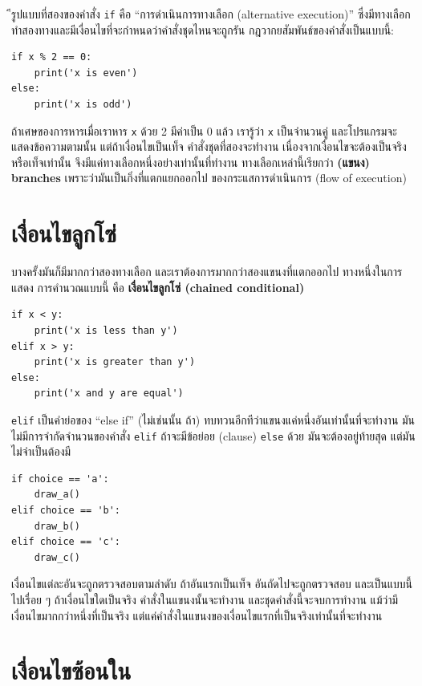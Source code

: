 ีรูปแบบที่สองของคำสั่ง {\tt if} คือ ``การดำเนินการทางเลือก (alternative execution)''
ซึ่งมีทางเลือกทำสองทางและมีเงื่อนไขที่จะกำหนดว่าคำสั่งชุดไหนจะถูกรัน กฎวากยสัมพันธ์ของคำสั่งเป็นแบบนี้:

\begin{verbatim}
if x % 2 == 0:
    print('x is even')
else:
    print('x is odd')
\end{verbatim}
%
ถ้าเศษของการหารเมื่อเราหาร {\tt x} ด้วย 2 มีค่าเป็น 0 แล้ว เรารู้ว่า {\tt x} เป็นจำนวนคู่
และโปรแกรมจะแสดงข้อความตามนั้น  แต่ถ้าเงื่อนไขเป็นเท็จ คำสั่งชุดที่สองจะทำงาน
เนื่องจากเงื่อนไขจะต้องเป็นจริงหรือเท็จเท่านั้น จึงมีแค่ทางเลือกหนึ่งอย่างเท่านั้นที่ทำงาน
ทางเลือกเหล่านี้เรียกว่า {\bf (แขนง) branches} เพราะว่ามันเป็นกิ่งที่แตกแยกออกไป
ของกระแสการดำเนินการ (flow of execution)



\section{เงื่อนไขลูกโซ่} %

บางครั้งมันก็มีมากกว่าสองทางเลือก และเราต้องการมากกว่าสองแขนงที่แตกออกไป ทางหนึ่งในการแสดง
การคำนวณแบบนี้ คือ {\bf เงื่อนไขลูกโซ่ (chained conditional)}

\begin{verbatim}
if x < y:
    print('x is less than y')
elif x > y:
    print('x is greater than y')
else:
    print('x and y are equal')
\end{verbatim}
%
{\tt elif} เป็นคำย่อของ ``else if'' (ไม่เช่นนั้น ถ้า) ทบทวนอีกทีว่าแขนงแค่หนึ่งอันเท่านั้นที่จะทำงาน
มันไม่มีการจำกัดจำนวนของคำสั่ง {\tt elif}  ถ้าจะมีข้อย่อย (clause) {\tt else} ด้วย 
มันจะต้องอยู่ท้ายสุด แต่มันไม่จำเป็นต้องมี

\begin{verbatim}
if choice == 'a':
    draw_a()
elif choice == 'b':
    draw_b()
elif choice == 'c':
    draw_c()
\end{verbatim}
%
เงื่อนไขแต่ละอันจะถูกตรวจสอบตามลำดับ ถ้าอันแรกเป็นเท็จ อันถัดไปจะถูกตรวจสอบ และเป็นแบบนี้ไปเรื่อย ๆ
ถ้าเงื่อนไขใดเป็นจริง คำสั่งในแขนงนั้นจะทำงาน และชุดคำสั่งนี้จะจบการทำงาน
แม้ว่ามีเงื่อนไขมากกว่าหนึ่งที่เป็นจริง แต่แค่คำสั่งในแขนงของเงื่อนไขแรกที่เป็นจริงเท่านั้นที่จะทำงาน


\section{เงื่อนไขซ้อนใน} %

